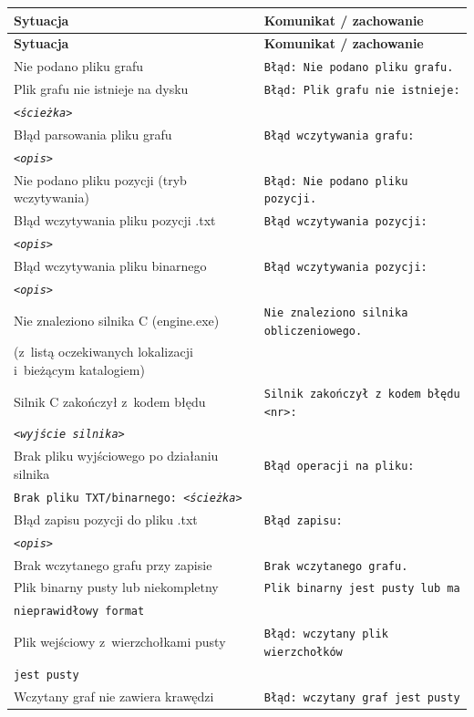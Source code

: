 \documentclass[12pt,a4paper]{article}
\begin{document}
\vspace{0.3cm}
\renewcommand{\arraystretch}{1.4}
\begin{longtable}{>{\raggedright\arraybackslash}p{6cm} >{\raggedright\arraybackslash}p{7.5cm}}
\toprule
\textbf{Sytuacja} & \textbf{Komunikat / zachowanie} \\
\midrule
\endfirsthead
\toprule
\textbf{Sytuacja} & \textbf{Komunikat / zachowanie} \\
\midrule
\endhead
\bottomrule
\endfoot
Nie podano pliku grafu & \texttt{Błąd: Nie podano pliku grafu.} \\
\addlinespace
Plik grafu nie istnieje na dysku & \texttt{Błąd: Plik grafu nie istnieje:}\\ \texttt{<\textit{ścieżka}>} \\
\addlinespace
Błąd parsowania pliku grafu & \texttt{Błąd wczytywania grafu:}\\ \texttt{<\textit{opis}>} \\
\addlinespace
Nie podano pliku pozycji (tryb wczytywania) & \texttt{Błąd: Nie podano pliku pozycji.} \\
\addlinespace
Błąd wczytywania pliku pozycji .txt & \texttt{Błąd wczytywania pozycji:}\\ \texttt{<\textit{opis}>} \\
\addlinespace
Błąd wczytywania pliku binarnego & \texttt{Błąd wczytywania pozycji:}\\ \texttt{<\textit{opis}>} \\
\addlinespace
Nie znaleziono silnika C (engine.exe) & \texttt{Nie znaleziono silnika obliczeniowego.}\\(z~listą oczekiwanych lokalizacji i~bieżącym katalogiem) \\
\addlinespace
Silnik C zakończył z~kodem błędu & \texttt{Silnik zakończył z~kodem błędu <nr>:}\\ \texttt{<\textit{wyjście silnika}>} \\
\addlinespace
Brak pliku wyjściowego po działaniu silnika & \texttt{Błąd operacji na pliku:}\\ \texttt{Brak pliku TXT/binarnego: <\textit{ścieżka}>} \\
\addlinespace
Błąd zapisu pozycji do pliku .txt & \texttt{Błąd zapisu:}\\ \texttt{<\textit{opis}>} \\
\addlinespace
Brak wczytanego grafu przy zapisie & \texttt{Brak wczytanego grafu.} \\
\addlinespace
Plik binarny pusty lub niekompletny & \texttt{Plik binarny jest pusty lub ma}\\ \texttt{nieprawidłowy format} \\
\addlinespace
Plik wejściowy z~wierzchołkami pusty & \texttt{Błąd: wczytany plik wierzchołków}\\ \texttt{jest pusty} \\
\addlinespace
Wczytany graf nie zawiera krawędzi & \texttt{Błąd: wczytany graf jest pusty} \\
\bottomrule
\end{longtable}

\end{document}
